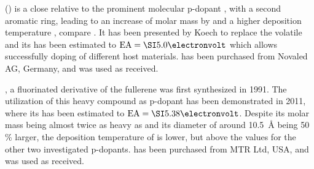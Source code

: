 \minisec{\FS}
\FS (\FSLong) is a close relative to the prominent molecular p-dopant \FV, with a second aromatic ring, leading to an increase of molar mass by  and a  higher deposition temperature \Tdep, compare . It has been presented by Koech\etal\cite{Koech2010} to replace the volatile \FV and its \EA has been estimated to \mbox{$\text{EA}=\eV{5.0}$}\cite{Tietze2012} which allows successfully doping of different host materials\cite{Tietze2012,Kleemann2012a}.
\FS has been purchased from Novaled AG, Germany, and was used as received.

\minisec{\CSF}
\CSF, a fluorinated derivative of the fullerene \CS was first synthesized in 1991\cite{Selig1991}. The utilization of this heavy compound as p-dopant has been demonstrated in 2011, where its \EA has been estimated to \mbox{$\text{EA}=\eV{5.38}$}\cite{Meerheim2011}.
Despite its molar mass being almost twice as heavy as \CS and its diameter of around \SI{10.5}{\angstrom} being 50\,\% larger, the deposition temperature of \CSF is  lower, but above the values for the other two investigated p-dopants.
\CSF has been purchased from MTR Ltd, USA, and was used as received.

\vspace*{1cm}

